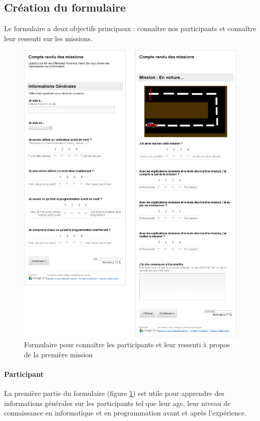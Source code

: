 \subsection{Création du formulaire}
Le formulaire a deux objectifs principaux : connaître nos participants et connaître leur ressenti sur les missions.
\begin{figure}%
  \begin{center}
    \includegraphics[width=\textwidth]{content/8-validation/images/form}
    \caption{Formulaire pour connaître les participants et leur ressenti à propos de la première mission}
    \label{fig:form-user}
  \end{center}
\end{figure}

\paragraph{Participant}
La première partie du formulaire (figure \ref{fig:form-user}) est utile pour apprendre des informations générales sur les participants tel que leur age, leur niveau de connaissance en informatique et en programmation avant et après l'expérience.

